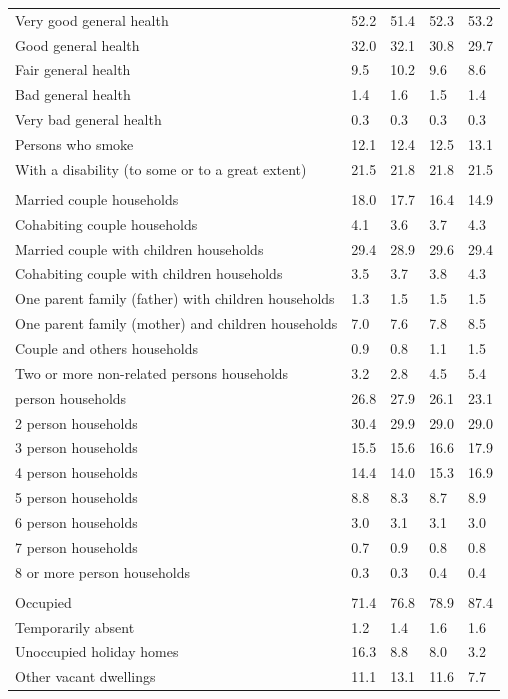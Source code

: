 \documentclass{article}
\begin{document}
\begin{table}[h]
\begin{tabular}{KTTTT}
    \hline
Very good general health & 52.2& 51.4&52.3& 53.2\\
Good general health & 32.0& 32.1& 30.8& 29.7\\
Fair general health &  9.5& 10.2& 9.6&  8.6\\
Bad general health & 1.4& 1.6&1.5& 1.4\\
Very bad general health & 0.3& 0.3&0.3& 0.3\\
    \hline
Persons who smoke & 12.1& 12.4&12.5& 13.1\\
    \hline
With a disability (to some or to a great extent) & 21.5& 21.8&21.8& 21.5\\
\hline
    \\ 
    \hline
Married couple households & 18.0& 17.7& 16.4& 14.9\\
Cohabiting couple households & 4.1& 3.6& 3.7& 4.3\\
Married couple with children households & 29.4& 28.9& 29.6& 29.4\\
Cohabiting couple with children households & 3.5& 3.7& 3.8& 4.3\\
One parent family (father) with  children households & 1.3& 1.5& 1.5& 1.5\\
One parent family (mother) and children households & 7.0& 7.6& 7.8& 8.5\\
Couple and others households  & 0.9& 0.8& 1.1& 1.5\\
Two or more non-related persons households & 3.2& 2.8& 4.5& 5.4\\
     person households & 26.8& 27.9& 26.1& 23.1\\
2 person households & 30.4& 29.9& 29.0& 29.0\\
3 person households & 15.5& 15.6& 16.6& 17.9\\
4 person households & 14.4& 14.0& 15.3& 16.9\\
5 person households & 8.8& 8.3& 8.7& 8.9\\
6 person households & 3.0& 3.1& 3.1& 3.0\\
7 person households & 0.7& 0.9& 0.8& 0.8\\
8 or more person households & 0.3& 0.3& 0.4& 0.4\\
\hline
    \\ 
    \hline
Occupied & 71.4& 76.8& 78.9& 87.4\\
Temporarily absent & 1.2& 1.4& 1.6& 1.6\\
Unoccupied holiday homes & 16.3&  8.8&  8.0&  3.2\\
Other vacant dwellings & 11.1& 13.1& 11.6&  7.7\\
\hline
\end{tabular}
\end{table}
\end{document}
